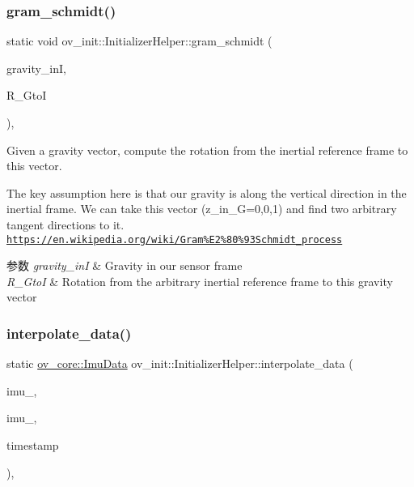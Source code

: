 \subsubsection{\texorpdfstring{gram\+\_\+schmidt()}{gram\_schmidt()}}
{\footnotesize\ttfamily static void ov\+\_\+init\+::\+Initializer\+Helper\+::gram\+\_\+schmidt (\begin{DoxyParamCaption}\item[{const Eigen\+::\+Vector3d \&}]{gravity\+\_\+inI,  }\item[{Eigen\+::\+Matrix3d \&}]{R\+\_\+\+GtoI }\end{DoxyParamCaption})\hspace{0.3cm}{\ttfamily [inline]}, {\ttfamily [static]}}



Given a gravity vector, compute the rotation from the inertial reference frame to this vector. 

The key assumption here is that our gravity is along the vertical direction in the inertial frame. We can take this vector (z\+\_\+in\+\_\+G=0,0,1) and find two arbitrary tangent directions to it. \href{https://en.wikipedia.org/wiki/Gram%E2%80%93Schmidt_process}{\tt https\+://en.\+wikipedia.\+org/wiki/\+Gram\%\+E2\%80\%93\+Schmidt\+\_\+process}


\begin{DoxyParams}{参数}
{\em gravity\+\_\+inI} & Gravity in our sensor frame \\
\hline
{\em R\+\_\+\+GtoI} & Rotation from the arbitrary inertial reference frame to this gravity vector \\
\hline
\end{DoxyParams}
\mbox{\label{classov__init_1_1InitializerHelper_aa5c39a05a5c4328b02907012922fe4cf}} 
\subsubsection{\texorpdfstring{interpolate\+\_\+data()}{interpolate\_data()}}
{\footnotesize\ttfamily static \hyperlink{structov__core_1_1ImuData}{ov\+\_\+core\+::\+Imu\+Data} ov\+\_\+init\+::\+Initializer\+Helper\+::interpolate\+\_\+data (\begin{DoxyParamCaption}\item[{const \hyperlink{structov__core_1_1ImuData}{ov\+\_\+core\+::\+Imu\+Data} \&}]{imu\+\_,  }\item[{const \hyperlink{structov__core_1_1ImuData}{ov\+\_\+core\+::\+Imu\+Data} \&}]{imu\+\_,  }\item[{double}]{timestamp }\end{DoxyParamCaption})\hspace{0.3cm}{\ttfamily [inline]}, {\ttfamily [static]}}



